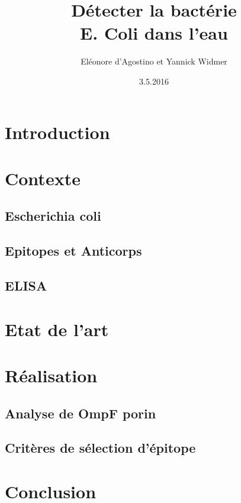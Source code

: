\documentclass{article}
\title{Détecter la bactérie\\ {\huge E. Coli} dans l'eau}
\date{3.5.2016}
\author{Eléonore d'Agostino et Yannick Widmer}
\begin{document}
  \maketitle
  \tableofcontents
  \newpage
  
  \section{Introduction}
  
  \section{Contexte}
  
    \subsection{Escherichia coli}
    
    \subsection{Epitopes et Anticorps}
    
    \subsection{ELISA}
    
  \section{Etat de l'art}
  
  \section{Réalisation}
  
    \subsection{Analyse de OmpF porin}
    
    \subsection{Critères de sélection d'épitope}
  
  \section{Conclusion}
\end{document}

